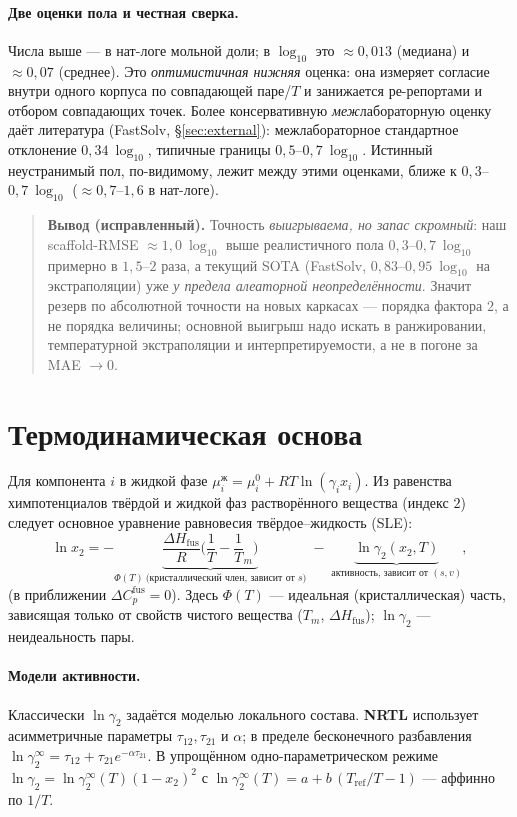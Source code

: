 \documentclass[11pt]{article}
\theoremstyle{plain}
\theoremstyle{definition}
\newcommand{\lnx}{\ln x_2}
\newcommand{\dHfus}{\Delta H_{\mathrm{fus}}}
\newcommand{\Tm}{T_m}
\newcommand{\lng}{\ln\gamma_2}
\begin{document}
\paragraph{Две оценки пола и честная сверка.} Числа выше --- в нат-логе мольной
доли; в $\log_{10}$ это $\approx 0{,}013$ (медиана) и $\approx 0{,}07$ (среднее).
Это \emph{оптимистичная нижняя} оценка: она измеряет согласие внутри одного
корпуса по совпадающей паре/$T$ и занижается ре-репортами и отбором совпадающих
точек. Более консервативную \emph{меж}лабораторную оценку даёт литература
(FastSolv, \S\ref{sec:external}): межлабораторное стандартное отклонение
$0{,}34\ \log_{10}$, типичные границы $0{,}5$--$0{,}7\ \log_{10}$. Истинный
неустранимый пол, по-видимому, лежит между этими оценками, ближе к
$0{,}3$--$0{,}7\ \log_{10}$ ($\approx 0{,}7$--$1{,}6$ в нат-логе).

\begin{quote}\textbf{Вывод (исправленный).} Точность \emph{выигрываема, но запас
скромный}: наш scaffold-RMSE $\approx 1{,}0\ \log_{10}$ выше реалистичного пола
$0{,}3$--$0{,}7\ \log_{10}$ примерно в $1{,}5$--$2$ раза, а текущий SOTA (FastSolv,
$0{,}83$--$0{,}95\ \log_{10}$ на экстраполяции) уже \emph{у предела алеаторной
неопределённости}. Значит резерв по абсолютной точности на новых каркасах ---
порядка фактора $2$, а не порядка величины; основной выигрыш надо искать в
ранжировании, температурной экстраполяции и интерпретируемости, а не в погоне за
MAE $\to 0$.\end{quote}

\section{Термодинамическая основа}
Для компонента $i$ в жидкой фазе $\mu_i^{\text{ж}}=\mu_i^{0}+RT\ln(\gamma_i x_i)$.
Из равенства химпотенциалов твёрдой и жидкой фаз растворённого вещества (индекс
$2$) следует основное уравнение равновесия твёрдое--жидкость (SLE):
\begin{equation}
\lnx = -\underbrace{\frac{\dHfus}{R}\!\Big(\frac1T-\frac1\Tm\Big)}
            _{\Phi(T)\ \text{(кристаллический член, зависит от }s)}
       \;-\;\underbrace{\lng(x_2,T)}_{\text{активность, зависит от }(s,v)},
\label{eq:sle}
\end{equation}
(в приближении $\Delta C_p^{\text{fus}}=0$). Здесь $\Phi(T)$ --- идеальная
(кристаллическая) часть, зависящая только от свойств чистого вещества ($\Tm$,
$\dHfus$); $\lng$ --- неидеальность пары.

\paragraph{Модели активности.} Классически $\lng$ задаётся моделью локального
состава. \textbf{NRTL} использует асимметричные параметры $\tau_{12},\tau_{21}$ и
$\alpha$; в пределе бесконечного разбавления
$\ln\gamma_2^\infty=\tau_{12}+\tau_{21}e^{-\alpha\tau_{21}}$. В упрощённом
одно-параметрическом режиме $\lng=\ln\gamma_2^\infty(T)(1-x_2)^2$ с
$\ln\gamma_2^\infty(T)=a+b\,(T_{\text{ref}}/T-1)$ --- аффинно по $1/T$.
\end{document}

